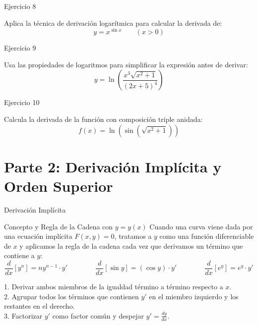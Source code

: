 \documentclass[aspectratio=169]{beamer}
\begin{document}
\begin{frame}{Ejercicio 8}
  \begin{mwejercicio}
    Aplica la técnica de derivación logarítmica para calcular la derivada de:
    $$y = x^{\sin x} \qquad (x > 0)$$
  \end{mwejercicio}
  \vspace{3.5cm}
\end{frame}
\begin{frame}{Ejercicio 9}
  \begin{mwejercicio}
    Usa las propiedades de logaritmos para simplificar la expresión antes de derivar:
    $$y = \ln\left(\frac{x^3 \sqrt{x^2 + 1}}{(2x + 5)^4}\right)$$
  \end{mwejercicio}
  \vspace{3.5cm}
\end{frame}
\begin{frame}{Ejercicio 10}
  \begin{mwejercicio}
    Calcula la derivada de la función con composición triple anidada:
    $$f(x) = \ln\left(\sin\left(\sqrt{x^2 + 1}\right)\right)$$
  \end{mwejercicio}
  \vspace{3.5cm}
\end{frame}


\section{Parte 2: Derivación Implícita y Orden Superior}


\begin{frame}{Derivación Implícita}
  \begin{block}{Concepto y Regla de la Cadena con $y = y(x)$}
    Cuando una curva viene dada por una ecuación implícita $F(x, y) = 0$, tratamos a $y$ como una función diferenciable de $x$ y aplicamos la regla de la cadena cada vez que derivamos un término que contiene a $y$:
    $$\frac{d}{dx}[y^n] = n y^{n-1} \cdot y' \qquad\qquad \frac{d}{dx}[\sin y] = (\cos y) \cdot y' \qquad\qquad \frac{d}{dx}[e^y] = e^y \cdot y'$$
  \end{block}

  \vspace{4pt}
  \begin{mwpasos}
    1. Derivar ambos miembros de la igualdad término a término respecto a $x$. \\
    2. Agrupar todos los términos que contienen $y'$ en el miembro izquierdo y los restantes en el derecho. \\
    3. Factorizar $y'$ como factor común y despejar $y' = \frac{dy}{dx}$.
  \end{mwpasos}
\end{frame}
\end{document}
